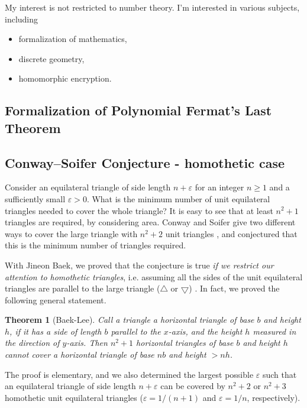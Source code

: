 \documentclass[12pt]{article}
\newtheorem*{theorem*}{Theorem}
\begin{document}
My interest is not restricted to number theory. I'm interested in various subjects, including
\begin{itemize}
    \item formalization of mathematics,
    \item discrete geometry,
    \item homomorphic encryption.
\end{itemize}




\subsection*{Formalization of Polynomial Fermat's Last Theorem}

\subsection*{Conway--Soifer Conjecture - homothetic case}

Consider an equilateral triangle of side length $n + \varepsilon$ for an integer $n \geq 1$ and a sufficiently small $\varepsilon > 0$.
What is the minimum number of unit equilateral triangles needed to cover the whole triangle?
It is easy to see that at least $n^2 + 1$ triangles are required, by considering area.
Conway and Soifer give two different ways to cover the large triangle with $n^2 + 2$ unit triangles \cite{conway2005covering}, and conjectured that this is the minimum number of triangles required.

With Jineon Baek, we proved that the conjecture is true \emph{if we restrict our attention to homothetic triangles}, i.e. assuming all the sides of the unit equilateral triangles are parallel to the large triangle ($\bigtriangleup$ or $\bigtriangledown$) \cite{baek2024n2}.
In fact, we proved the following general statement.

\begin{theorem*}[Baek-Lee]
Call a triangle a horizontal triangle of base $b$ and height $h$, if it has a side of length $b$ parallel to the $x$-axis, and the height $h$ measured in the direction of $y$-axis.
Then $n^2 + 1$ horizontal triangles of base $b$ and height $h$ cannot cover a horizontal triangle of base $nb$ and height $> nh$.
\end{theorem*}

The proof is elementary, and we also determined the largest possible $\varepsilon$ such that an equilateral triangle of side length $n + \varepsilon$ can be covered by $n^2 + 2$ or $n^2 + 3$ homothetic unit equilateral triangles ($\varepsilon = 1/(n+1)$ and $\varepsilon = 1 / n$, respectively). 
\end{document}
